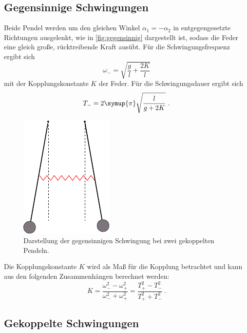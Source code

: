 \clearpage
\subsection{Gegensinnige Schwingungen}
\label{sec:gegensinnige_schwingung}

    Beide Pendel werden um den gleichen Winkel $\alpha_1 = -\alpha_2$ in entgegengesetzte Richtungen ausgelenkt,
    wie in \autoref{fig:gegensinnig} dargestellt ist,
    sodass die Feder eine gleich große,
    rücktreibende Kraft ausübt.
    Für die Schwingungsfrequenz ergibt sich
    \begin{equation}
        \omega_- = \sqrt{\frac{g}{l} + \frac{2K}{l}}
        \label{eqn:frequenz_gegensinnig}
    \end{equation}
    mit der Kopplungskonstante $K$ der Feder.
    Für die Schwingungsdauer ergibt sich
    \begin{equation}
        T_- = 2\symup{\pi} \sqrt{\frac{l}{g + 2K}} \ .
        \label{eqn:dauer_gegensinnig}
    \end{equation}
    \begin{figure}
        \centering
            \includegraphics[scale=0.9]{content/img/Abb_2.pdf}
            \caption{Darstellung der gegensinnigen Schwingung bei zwei gekoppelten Pendeln. \cite{versuchsanleitung}}
            \label{fig:gegensinnig}
    \end{figure}


    Die Kopplungskonstante $K$ wird als Maß für die Kopplung betrachtet und kann aus den folgenden Zusammenhängen berechnet werden:
    \begin{equation}
        K = \frac{\omega^2_- - \omega^2_+}{\omega^2_- + \omega^2_+} = \frac{T^2_+ - T^2_-}{T^2_+ + T^2_-} \ .
        \label{eqn:kopplungskonstante}
    \end{equation}


\clearpage
\subsection{Gekoppelte Schwingungen}
\label{sec:gekoppelte_schwingung}

